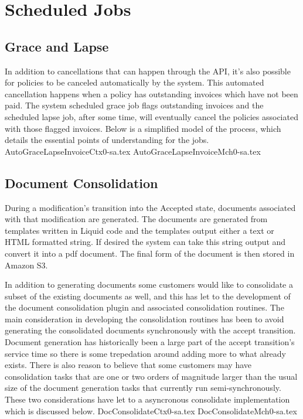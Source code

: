 \chapter{Scheduled Jobs}
\label{intro:jobs} %

\abstract{}

\section{Grace and Lapse}
\label{sec:jobs:1}
In addition to cancellations that can happen through the API, it's also possible for policies to be canceled automatically by
the system. This automated cancellation happens when a policy has outstanding invoices which have not been paid. The system
scheduled grace job flags outstanding invoices and the scheduled lapse job, after some time, will eventually cancel the policies
associated with those flagged invoices. Below is a simplified model of the process, which details the essential points of
understanding for the jobs.
{AutoGraceLapseInvoiceCtx0-sa.tex}
{AutoGraceLapseInvoiceMch0-sa.tex}

\section{Document Consolidation}
\label{sec:jobs:2}
During a modification's transition into the Accepted state, documents associated with that modification are generated.
The documents are generated from templates written in Liquid code and the templates output either a text or HTML formatted
string. If desired the system
can take this string output and convert it into a pdf document. The final form of the document is then stored in Amazon S3.

In addition to generating documents some customers would like to consolidate a subset of the existing documents as well, and this has
let to the development of the document consolidation plugin and associated consolidation routines. The main consideration in
developing the consolidation routines has been to avoid generating the consolidated documents synchronously with the accept transition.
Document generation has historically been a large part of the accept transition's service time so there is some trepedation around adding
more to what already exists. There is also reason to believe that some customers may have consolidation tasks that are one or two orders of
magnitude larger than the usual size of the document generation tasks that currently run semi-synchronously. These two considerations have
let to a asyncronous consolidate implementation which is discussed below.
{DocConsolidateCtx0-sa.tex}
{DocConsolidateMch0-sa.tex}
